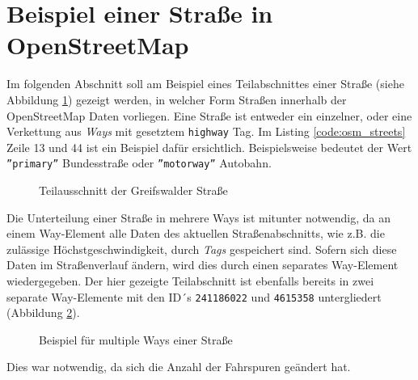 \section{Beispiel einer Straße in OpenStreetMap}
\label{sec:appenix:osm:streets}
Im folgenden Abschnitt soll am Beispiel eines Teilabschnittes einer Straße (siehe Abbildung \ref{fig:osm_streets_1}) gezeigt werden, in welcher Form Straßen innerhalb der OpenStreetMap Daten vorliegen.
Eine Straße ist entweder ein einzelner, oder eine Verkettung aus \textit{Ways} mit gesetztem \texttt{highway} Tag.
Im Listing \ref{code:osm_streets} Zeile 13 und 44 ist ein Beispiel dafür ersichtlich. Beispielsweise bedeutet der Wert \texttt{''primary''} Bundesstraße oder \texttt{''motorway''} Autobahn.
\begin{figure}[htb]
  \centering
   \caption{Teilausschnitt der Greifswalder Straße}
   \label{fig:osm_streets_1}
\end{figure}
Die Unterteilung einer Straße in mehrere Ways ist mitunter notwendig, da an einem Way-Element alle Daten des aktuellen Straßenabschnitts, wie z.B. die zulässige Höchstgeschwindigkeit, durch \textit{Tags} gespeichert sind. Sofern sich diese Daten im Straßenverlauf ändern, wird dies durch einen separates Way-Element wiedergegeben.
Der hier gezeigte Teilabschnitt ist ebenfalls bereits in zwei separate Way-Elemente mit den ID´s \texttt{241186022} und \texttt{4615358} untergliedert (Abbildung \ref{fig:osm_streets_2}).
\begin{figure}[htb]
  \centering
   \caption{Beispiel für multiple Ways einer Straße}
   \label{fig:osm_streets_2}
\end{figure}
Dies war notwendig, da sich die Anzahl der Fahrspuren geändert hat.
